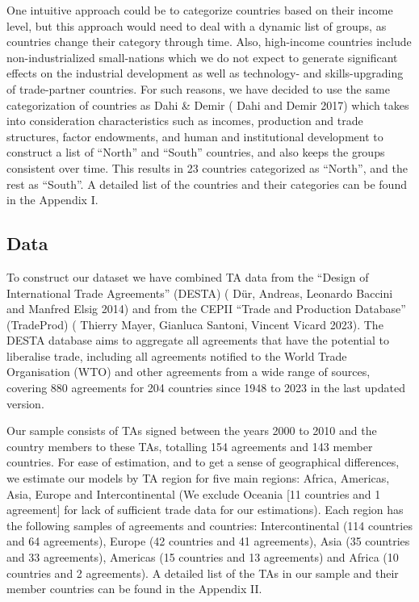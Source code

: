 \documentclass[12pt]{article}%
\begin{document}
One intuitive approach could be to categorize countries based on their
income level, but this approach would need to deal with a dynamic list
of groups, as countries change their category through time. Also,
high-income countries include non-industrialized small-nations which we
do not expect to generate significant effects on the industrial
development as well as technology- and skills-upgrading of trade-partner
countries. For such reasons, we have decided to use the same
categorization of countries as Dahi \& Demir (\cite{dahi_south-south_2017} Dahi and Demir 2017) which
takes into consideration characteristics such as incomes, production and
trade structures, factor endowments, and human and institutional
development to construct a list of ``North'' and ``South'' countries,
and also keeps the groups consistent over time. This results in 23
countries categorized as ``North'', and the rest as ``South''. A
detailed list of the countries and their categories can be found in the
Appendix I.%
\subsection{Data}%
\label{subsec:Data}%

%
To construct our dataset we have combined TA data from the ``Design of
International Trade Agreements'' (DESTA) (\cite{dur_andreas_leonardo_baccini_and_manfred_elsig_design_2014} Dür, Andreas, Leonardo Baccini
and Manfred Elsig 2014) and from the CEPII ``Trade and Production
Database'' (TradeProd) (\cite{thierry_mayer_gianluca_santoni_vincent_vicard_cepii_2023} Thierry Mayer, Gianluca Santoni, Vincent Vicard
2023). The DESTA database aims to aggregate all agreements that have the
potential to liberalise trade, including all agreements notified to the
World Trade Organisation (WTO) and other agreements from a wide range of
sources, covering 880 agreements for 204 countries since 1948 to 2023 in
the last updated version.

Our sample consists of TAs signed between the years 2000 to 2010 and the
country members to these TAs, totalling 154 agreements and 143 member
countries. For ease of estimation, and to get a sense of geographical
differences, we estimate our models by TA region for five main regions:
Africa, Americas, Asia, Europe and Intercontinental (We exclude Oceania
{[}11 countries and 1 agreement{]} for lack of sufficient trade data for
our estimations). Each region has the following samples of agreements
and countries: Intercontinental (114 countries and 64 agreements),
Europe (42 countries and 41 agreements), Asia (35 countries and 33
agreements), Americas (15 countries and 13 agreements) and Africa (10
countries and 2 agreements). A detailed list of the TAs in our sample and their 
member countries can be found in the Appendix II.
\end{document}
